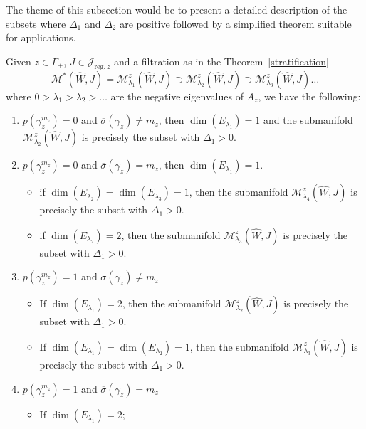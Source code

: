 \documentclass[11pt, a4paper]{amsart}
\newcommand{\cJ}{\mathcal{J}}
\newcommand{\cM}{\mathcal{M}}
\begin{document}
The theme of this subsection would be to present a detailed description of the subsets where $\Delta_1$ and $\Delta_2$ are positive followed by a simplified theorem suitable for applications.

\begin{lemma}
Given $z\in \Gamma_+$, $J \in \cJ_{\mathrm{reg},z}$ and a filtration as in the Theorem~\ref{stratification}
$$\cM^*(\widehat{W},J) = \cM^z_{\lambda_1}(\widehat{W},J) \supset \cM^z_{\lambda_2}(\widehat{W},J) \supset \cM^z_{\lambda_3}(\widehat{W},J) \dots $$
where $0>\lambda_1> \lambda_2> \dots $ are the negative eigenvalues of $A_z$, we have the following:

\begin{enumerate}[topsep=5pt,itemsep=5pt]
    \item[Case 1:] $p(\gamma_z^{m_z})=0$ and $\overline{\sigma}(\gamma_z) \neq m_z$, then $\dim(E_{\lambda_1})=1$ and the submanifold $\cM^z_{\lambda_2}(\widehat{W},J)$ is precisely the subset with $\Delta_1>0$.
    \item[Case 2:] $p(\gamma_z^{m_z})=0$ and $\overline{\sigma}(\gamma_z) = m_z$, then $\dim(E_{\lambda_1})=1$. 
    \begin{itemize}[topsep=5pt,itemsep=5pt]
     \item if $\dim(E_{\lambda_2})=\dim(E_{\lambda_3})=1$, then the submanifold $\cM^z_{\lambda_4}(\widehat{W},J)$ is precisely the subset with $\Delta_1>0$.
    \item if $\dim(E_{\lambda_2})=2$, then the submanifold $\cM^z_{\lambda_3}(\widehat{W},J)$ is precisely the subset with $\Delta_1>0$.
    \end{itemize}
    \item[Case 3:] $p(\gamma_z^{m_z})=1$ and $\overline{\sigma}(\gamma_z) \neq m_z$
    \begin{itemize}[topsep=5pt,itemsep=5pt]
    \item If $\dim(E_{\lambda_1})=2$, then the submanifold $\cM^z_{\lambda_2}(\widehat{W},J)$ is precisely the subset with $\Delta_1>0$.
    \item If $\dim(E_{\lambda_1})=\dim(E_{\lambda_2})=1$, then the submanifold $\cM^z_{\lambda_3}(\widehat{W},J)$ is precisely the subset with $\Delta_1>0$.
    \end{itemize}
    \item[Case 4:] $p(\gamma_z^{m_z})=1$ and $\overline{\sigma}(\gamma_z) = m_z$
    \begin{itemize}[topsep=5pt,itemsep=5pt]
    \item If $\dim(E_{\lambda_1})=2$;

\end{itemize}
\end{enumerate}
\end{lemma}
\end{document}
